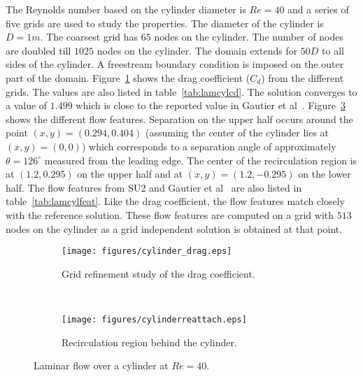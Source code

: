 The Reynolds number based on the cylinder diameter is $Re = 40$ and a series of five grids are used to study the properties. The diameter of the cylinder is $D=1m$. The coarsest grid has $65$ nodes on the cylinder. The number of nodes are doubled till $1025$ nodes on the cylinder. The domain extends for $50 D$ to all sides of the cylinder. A freestream boundary condition is imposed on the outer part of the domain. Figure~\ref{fig:cyl40cd} shows the drag coefficient ($C_d$) from the different grids. The values are also listed in table~\ref{tab:lamcylcd}. The solution converges to a value of $1.499$ which is close to the reported value in Gautier et al~\cite{cylinderref}. Figure~\ref{fig:cyl40rec} shows the different flow features. Separation on the upper half occurs around the point $(x,y) = (0.294,0.404)$ (assuming the center of the cylinder lies at $(x,y) = (0,0)$) which corresponds to a separation angle of approximately $\theta = 126^{\circ}$ measured from the leading edge. The center of the recirculation region is at $(1.2,0.295)$ on the upper half and at $(x,y) = (1.2,-0.295)$ on the lower half. The flow features from SU2 and Gautier et al~\cite{cylinderref} are also listed in table~\ref{tab:lamcylfeat}. Like the drag coefficient, the flow features match closely with the reference solution. These flow features are computed on a grid with $513$ nodes on the cylinder as a grid independent solution is obtained at that point.
\begin{figure}[h!]
    \centering
    \captionsetup{justification=centering}
    \begin{subfigure}[b]{0.45\textwidth}
    \captionsetup{justification=centering}
        \texttt{[image: figures/cylinder\_drag.eps]}
        \caption{Grid refinement study of the drag coefficient.}
        \label{fig:cyl40cd}
    \end{subfigure}
    ~ %
    \begin{subfigure}[b]{0.45\textwidth}
    \centering
    \captionsetup{justification=centering}
        \texttt{[image: figures/cylinderreattach.eps]}
        \caption{Recirculation region behind the cylinder.}
        \label{fig:cyl40rec}
    \end{subfigure}
    \caption{Laminar flow over a cylinder at $Re =40$.}
\end{figure}
